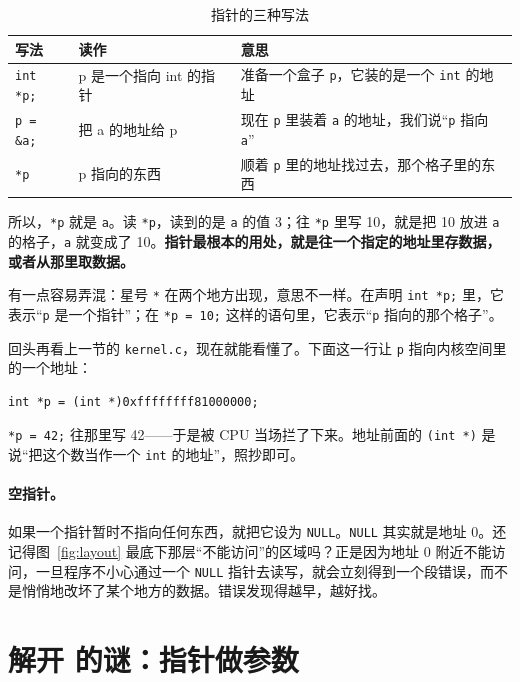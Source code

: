 \begin{table}[htbp]
  \begin{lazywide}
  \caption{指针的三种写法}
  \label{tab:pointer}
  \begin{tabular}{L{2.4cm}L{3.4cm}L{6.2cm}}
    \toprule
    写法 & 读作 & 意思 \\
    \midrule
    \texttt{int *p;} & p 是一个指向 int 的指针 & 准备一个盒子 \texttt{p}，它装的是一个 \texttt{int} 的地址 \\
    \texttt{p = \&a;} & 把 a 的地址给 p & 现在 \texttt{p} 里装着 \texttt{a} 的地址，我们说“\texttt{p} 指向 \texttt{a}” \\
    \texttt{*p} & p 指向的东西 & 顺着 \texttt{p} 里的地址找过去，那个格子里的东西 \\
    \bottomrule
  \end{tabular}
  \end{lazywide}
\end{table}

所以，\texttt{*p} 就是 \texttt{a}。读 \texttt{*p}，读到的是 \texttt{a} 的值 3；往 \texttt{*p} 里写 10，就是把 10 放进 \texttt{a} 的格子，\texttt{a} 就变成了 10。\textbf{指针最根本的用处，就是往一个指定的地址里存数据，或者从那里取数据。}

有一点容易弄混：星号 \texttt{*} 在两个地方出现，意思不一样。在声明 \texttt{int *p;} 里，它表示“\texttt{p} 是一个指针”；在 \texttt{*p = 10;} 这样的语句里，它表示“\texttt{p} 指向的那个格子”。

回头再看上一节的 \texttt{kernel.c}，现在就能看懂了。下面这一行让 \texttt{p} 指向内核空间里的一个地址：
\begin{verbatim}
int *p = (int *)0xffffffff81000000;
\end{verbatim}
\texttt{*p = 42;} 往那里写 42——于是被 CPU 当场拦了下来。地址前面的 \texttt{(int *)} 是说“把这个数当作一个 \texttt{int} 的地址”，照抄即可。

\paragraph{空指针。}
如果一个指针暂时不指向任何东西，就把它设为 \texttt{NULL}。\texttt{NULL} 其实就是地址 0。还记得图~\ref{fig:layout} 最底下那层“不能访问”的区域吗？正是因为地址 0 附近不能访问，一旦程序不小心通过一个 \texttt{NULL} 指针去读写，就会立刻得到一个段错误，而不是悄悄地改坏了某个地方的数据。错误发现得越早，越好找。

\section{解开 \texorpdfstring{}{scanf} 的谜：指针做参数}
\label{sec:swap}


